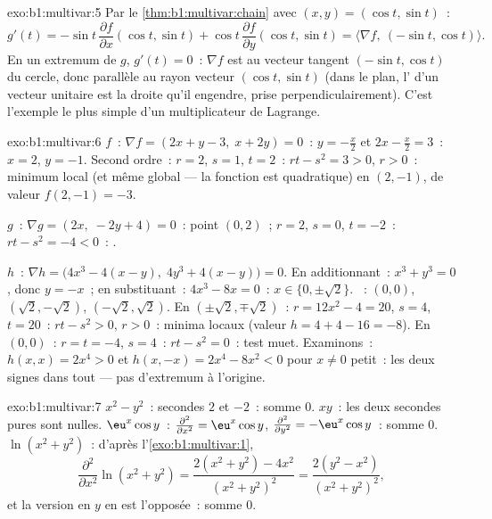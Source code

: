 \begin{solution}{exo:b1:multivar:5}
Par le \cref{thm:b1:multivar:chain} avec $(x, y) = (\cos t, \sin t)$~:
\[
g'(t) = -\sin t\,\frac{\partial f}{\partial x}(\cos t, \sin t)
+ \cos t\,\frac{\partial f}{\partial y}(\cos t, \sin t)
= \bigl\langle \nabla f,\ (-\sin t, \cos t)\bigr\rangle .
\]
En un extremum de $g$, $g'(t) = 0$~: $\nabla f$ est  au
vecteur tangent $(-\sin t, \cos t)$ du cercle, donc parallèle au
rayon vecteur $(\cos t, \sin t)$ (dans le plan, l' d'un
vecteur unitaire est la droite qu'il engendre, prise
perpendiculairement). C'est l'exemple le plus simple d'un
multiplicateur de Lagrange.
\end{solution}

\begin{solution}{exo:b1:multivar:6}
$f$~: $\nabla f = (2x + y - 3,\; x + 2y) = 0$~: $y = -\frac x2$ et
$2x - \frac x2 = 3$~: $x = 2$, $y = -1$. Second ordre~: $r = 2$, $s =
1$, $t = 2$~: $rt - s^2 = 3 > 0$, $r > 0$~: minimum local (et même
global --- la fonction est quadratique) en $(2, -1)$, de valeur
$f(2,-1) = -3$.

$g$~: $\nabla g = (2x,\; -2y + 4) = 0$~: point $(0, 2)$~; $r = 2$, $s
= 0$, $t = -2$~: $rt - s^2 = -4 < 0$~: .

$h$~: $\nabla h = \bigl(4x^3 - 4(x - y),\; 4y^3 + 4(x-y)\bigr) = 0$.
En additionnant~: $x^3 + y^3 = 0$, donc $y = -x$~; en substituant~:
$4x^3 - 8x = 0$~: $x \in \{0, \pm\sqrt2\}$. ~:
$(0,0)$, $(\sqrt2, -\sqrt2)$, $(-\sqrt2, \sqrt2)$.
En $(\pm\sqrt2, \mp\sqrt2)$~: $r = 12x^2 - 4 = 20$, $s = 4$, $t =
20$~: $rt - s^2 > 0$, $r > 0$~: minima locaux (valeur $h = 4 + 4 - 16 =
-8$). En $(0,0)$~: $r = t = -4$, $s = 4$~: $rt - s^2 = 0$~: test muet.
Examinons~: $h(x, x) = 2x^4 > 0$ et $h(x, -x) = 2x^4 - 8x^2 < 0$ pour
$x \neq 0$ petit~: les deux signes dans tout  --- pas
d'extremum à l'origine.
\end{solution}

\begin{solution}{exo:b1:multivar:7}
$x^2 - y^2$~:  secondes $2$ et $-2$~: somme $0$. $xy$~: les
deux  secondes pures sont nulles. $\eu^x\cos y$~:
$\frac{\partial^2}{\partial x^2} = \eu^x\cos y$,
$\frac{\partial^2}{\partial y^2} = -\eu^x\cos y$~: somme $0$.
$\ln(x^2+y^2)$~: d'après l'\cref{exo:b1:multivar:1},
\[
\frac{\partial^2}{\partial x^2}\ln(x^2+y^2)
= \frac{2(x^2+y^2) - 4x^2}{(x^2+y^2)^2}
= \frac{2(y^2 - x^2)}{(x^2+y^2)^2},
\]
et la version en $y$ en est l'opposée~: somme $0$.
\end{solution}

